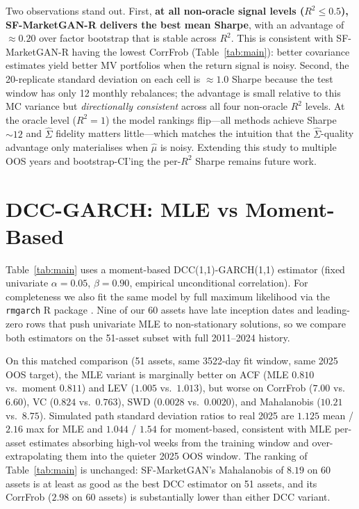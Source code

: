 Two observations stand out. First, \textbf{at all non-oracle signal levels ($R^2 \le 0.5$), SF-MarketGAN-R delivers the best mean Sharpe}, with an advantage of $\approx 0.20$ over factor bootstrap that is stable across $R^2$. This is consistent with SF-MarketGAN-R having the lowest CorrFrob (Table~\ref{tab:main}): better covariance estimates yield better MV portfolios when the return signal is noisy. Second, the 20-replicate standard deviation on each cell is $\approx 1.0$ Sharpe because the test window has only 12 monthly rebalances; the advantage is small relative to this MC variance but \emph{directionally consistent} across all four non-oracle $R^2$ levels. At the oracle level ($R^2 = 1$) the model rankings flip---all methods achieve Sharpe $\sim 12$ and $\hat\Sigma$ fidelity matters little---which matches the intuition that the $\hat\Sigma$-quality advantage only materialises when $\hat\mu$ is noisy. Extending this study to multiple OOS years and bootstrap-CI'ing the per-$R^2$ Sharpe remains future work.

\section{DCC-GARCH: MLE vs Moment-Based}
\label{app:dcc_mle}

Table~\ref{tab:main} uses a moment-based DCC(1,1)-GARCH(1,1) estimator (fixed univariate $\alpha{=}0.05$, $\beta{=}0.90$, empirical unconditional correlation). For completeness we also fit the same model by full maximum likelihood via the \texttt{rmgarch} R package \citep{ghalanos2019rmgarch}. Nine of our 60 assets have late inception dates and leading-zero rows that push univariate MLE to non-stationary solutions, so we compare both estimators on the 51-asset subset with full 2011--2024 history.

On this matched comparison (51 assets, same 3522-day fit window, same 2025 OOS target), the MLE variant is marginally better on ACF (MLE $0.810$ vs.\ moment $0.811$) and LEV ($1.005$ vs.\ $1.013$), but worse on CorrFrob ($7.00$ vs.\ $6.60$), VC ($0.824$ vs.\ $0.763$), SWD ($0.0028$ vs.\ $0.0020$), and Mahalanobis ($10.21$ vs.\ $8.75$). Simulated path standard deviation ratios to real 2025 are $1.125$ mean / $2.16$ max for MLE and $1.044$ / $1.54$ for moment-based, consistent with MLE per-asset estimates absorbing high-vol weeks from the training window and over-extrapolating them into the quieter 2025 OOS window. The ranking of Table~\ref{tab:main} is unchanged: SF-MarketGAN's Mahalanobis of $8.19$ on 60 assets is at least as good as the best DCC estimator on 51 assets, and its CorrFrob ($2.98$ on 60 assets) is substantially lower than either DCC variant.


